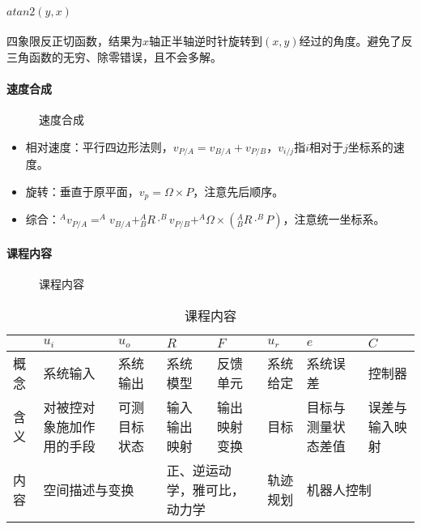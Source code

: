 \documentclass[
12pt, %
a4paper, 
oneside, %
headinclude,footinclude, %
]{scrartcl}
\begin{document}
\paragraph{$ atan2(y, x) $}
四象限反正切函数，结果为$ x $轴正半轴逆时针旋转到$ (x, y) $经过的角度。避免了反三角函数的无穷、除零错误，且不会多解。
\paragraph{速度合成}
\begin{figure}[H]
\centering
{} \quad
{}
\caption{速度合成}
\end{figure}

\begin{itemize}
\item 相对速度：平行四边形法则，$ v_{P/A} = v_{B/A} + v_{P/B} $，$ v_{i/j} $指$ i $相对于$ j $坐标系的速度。
\item 旋转：垂直于原平面，$ v_p = \Omega \times P $，注意先后顺序。
\item 综合：$ ^A v_{P/A} = ^A v_{B/A} + ^A_B R \cdot ^B v_{P/B} + ^A \Omega \times (^A_B R \cdot ^B P) $，注意统一坐标系。
\end{itemize}
\paragraph{课程内容}
\begin{figure}[H]
\centering
{} \quad
{}
\caption{课程内容}
\end{figure}

\begin{table}[H]
\centering
\begin{tabular}{|p{0.9cm}|p{2cm}|p{2cm}|p{2cm}|p{2cm}|p{2cm}|p{2cm}|p{2cm}|}
\hline
& $ u_i $ & $ u_o $ & $ R $ & $ F $ & $ u_r $ & $ e $ & $ C $ \\
\hline
概念 & 系统输入 & 系统输出 & 系统模型 & 反馈单元 & 系统给定 & 系统误差 & 控制器 \\
\hline
含义 & 对被控对象施加作用的手段 & 可测目标状态 & 输入输出映射 & 输出映射变换 & 目标 & 目标与测量状态差值 & 误差与输入映射 \\
\hline
内容 & \multicolumn{2}{l|}{空间描述与变换} & \multicolumn{2}{p{4cm}|}{正、逆运动学，雅可比，动力学} & 轨迹规划 & \multicolumn{2}{l|}{机器人控制} \\
\hline
\end{tabular}
\caption{课程内容}
\end{table}
\end{document}
